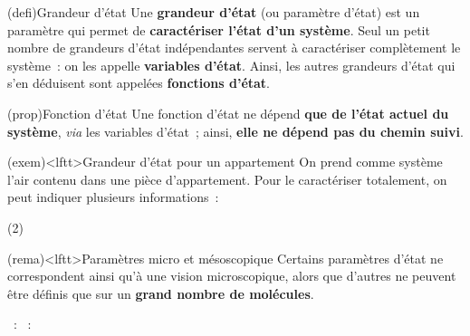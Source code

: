 \documentclass[../../main/main.tex]{subfiles}
\begin{document}
\begin{tcb*}(defi){Grandeur d'état}
	Une \textbf{grandeur d'état} (ou paramètre d'état) est un paramètre qui permet
	de \textbf{caractériser l'état d'un système}.
	\bigbreak
	Seul un petit nombre de grandeurs d'état indépendantes servent à caractériser
	complètement le système~: on les appelle \textbf{variables d'état}. Ainsi, les
	autres grandeurs d'état qui s'en déduisent sont appelées \textbf{fonctions
		d'état}.
\end{tcb*}

\begin{tcb*}(prop){Fonction d'état}
	Une fonction d'état ne dépend \textbf{que de l'état actuel du système},
	\textit{via} les variables d'état~; ainsi, \textbf{elle ne dépend pas du
		chemin suivi}.
\end{tcb*}

\begin{tcb}(exem)<lftt>{Grandeur d'état pour un appartement}
	On prend comme système l'air contenu dans une pièce d'appartement. Pour le
	caractériser totalement, on peut indiquer plusieurs informations~:
	\begin{tasks}[label=\bdmd](2)
		\task {}
		\task {}
		\task {}
		\task {}
	\end{tasks}
\end{tcb}

\begin{tcb}(rema)<lftt>{Paramètres micro et mésoscopique}
	Certains paramètres d'état ne correspondent ainsi qu'à une vision
	microscopique, alors que d'autres ne peuvent être définis que sur un
	\textbf{grand nombre de molécules}.
	\begin{itemize}
		~: 
		~: 
	\end{itemize}
\end{tcb}
\end{document}
